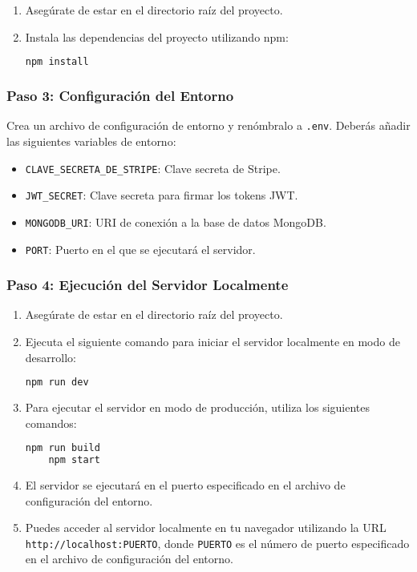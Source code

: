 \begin{enumerate}
	\item Asegúrate de estar en el directorio raíz del proyecto.
	\item Instala las dependencias del proyecto utilizando npm:
	      \begin{lstlisting}[language=bash]
    npm install
    \end{lstlisting}
\end{enumerate}

\subsubsection{Paso 3: Configuración del Entorno}

Crea un archivo de configuración de entorno y renómbralo a \texttt{.env}. Deberás añadir las siguientes variables de entorno:
\begin {itemize}
\item \texttt{CLAVE\_SECRETA\_DE\_STRIPE}: Clave secreta de Stripe.
\item \texttt{JWT\_SECRET}: Clave secreta para firmar los tokens JWT.
\item \texttt{MONGODB\_URI}: URI de conexión a la base de datos MongoDB.
\item \texttt{PORT}: Puerto en el que se ejecutará el servidor.
\end {itemize}

\subsubsection{Paso 4: Ejecución del Servidor Localmente}

\begin{enumerate}
	\item Asegúrate de estar en el directorio raíz del proyecto.
	\item Ejecuta el siguiente comando para iniciar el servidor localmente en modo de desarrollo:
	      \begin{lstlisting}[language=bash]
    npm run dev
    \end{lstlisting}
	\item Para ejecutar el servidor en modo de producción, utiliza los siguientes comandos:
	      \begin{lstlisting}[language=bash]
    npm run build
    npm start
    \end{lstlisting}
	\item El servidor se ejecutará en el puerto especificado en el archivo de configuración del entorno.
	\item Puedes acceder al servidor localmente en tu navegador utilizando la URL \texttt{http://localhost:PUERTO}, donde \texttt{PUERTO} es el número de puerto especificado en el archivo de configuración del entorno.
\end{enumerate}


